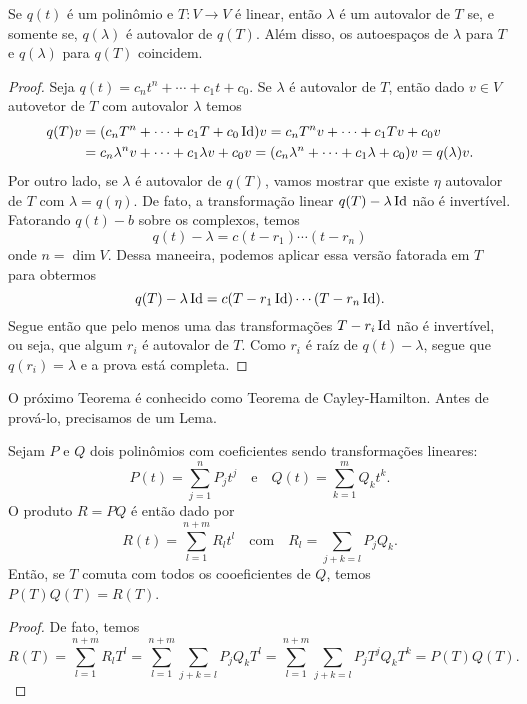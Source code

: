\begin{theorem}
    Se $q(t)$ é um polinômio e $T \colon V \to V$ é linear, então $\lambda$ é um autovalor de $T$ se, e somente se, $q(\lambda)$ é autovalor de $q(T)$. Além disso, os autoespaços de $\lambda$ para $T$ e $q(\lambda)$ para $q(T)$ coincidem.
\end{theorem}
\begin{proof}
    Seja $q(t) = c_n t^n + \cdots + c_1 t + c_0$. Se $\lambda$ é autovalor de $T$, então dado $v \in V$ autovetor de $T$ com autovalor $\lambda$ temos \begin{align}
        q(T)v &= (c_n T^n + \cdots + c_1 T + c_0\operatorname{Id})v = c_n T^nv + \cdots + c_1 Tv + c_0 v \\ &= c_n \lambda^n v + \cdots + c_1 \lambda v + c_0 v = (c_n \lambda^n + \cdots + c_1 \lambda + c_0)v = q(\lambda)v.
    \end{align} Por outro lado, se $\lambda$ é autovalor de $q(T)$, vamos mostrar que existe $\eta$ autovalor de $T$ com $\lambda = q(\eta)$. De  fato, a transformação linear $q(T) - \lambda\operatorname{Id}$ não é invertível. Fatorando $q(t) - b$ sobre os complexos, temos \begin{equation}
        q(t) - \lambda = c(t - r_1) \cdots (t - r_n)
    \end{equation} onde $n = \dim V$. Dessa maneeira, podemos aplicar essa versão fatorada em $T$ para obtermos \begin{equation}
        q(T) - \lambda\operatorname{Id} = c(T - r_1\operatorname{Id}) \cdots (T - r_n\operatorname{Id}).
    \end{equation} Segue então que pelo menos uma das transformações $T - r_i\operatorname{Id}$ não é invertível, ou seja, que algum $r_i$ é autovalor de $T$. Como $r_i$ é raíz de $q(t) - \lambda$, segue que $q(r_i) = \lambda$ e a prova está completa.
\end{proof}

O próximo Teorema é conhecido como Teorema de Cayley-Hamilton. Antes de prová-lo, precisamos de um Lema.

\begin{lemma}
    Sejam $P$ e $Q$ dois polinômios com coeficientes sendo transformações lineares: \begin{equation}
        P(t) = \sum_{j = 1}^n P_j t^j \quad \text{e} \quad Q(t) = \sum_{k = 1}^m Q_k t^k.
    \end{equation} O produto $R = PQ$ é então dado por \begin{equation}
        R(t) = \sum_{l = 1}^{n + m} R_l t^l \quad \text{com} \quad R_l = \sum_{j + k = l} P_jQ_k.
    \end{equation} Então, se $T$ comuta com todos os cooeficientes de $Q$, temos $P(T)Q(T) = R(T)$.
\end{lemma}
\begin{proof}
    De fato, temos \begin{equation}
        R(T) = \sum_{l = 1}^{n + m} R_lT^l = \sum_{l = 1}^{n+m} \sum_{j + k = l} P_jQ_kT^l = \sum_{l = 1}^{n+m} \sum_{j + k = l} P_jT^jQ_kT^k = P(T)Q(T).
    \end{equation}
\end{proof}

